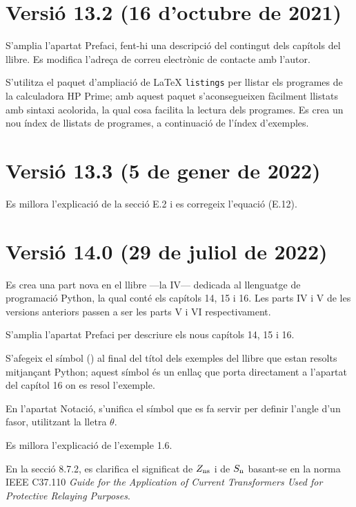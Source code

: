\section*{Versió 13.2 (16 d'octubre de 2021)}

S'amplia l'apartat Prefaci, fent-hi una descripció del contingut dels capítols del llibre. Es modifica l'adreça de correu electrònic de contacte amb l'autor.

S'utilitza el paquet d'ampliació de \LaTeX{} \texttt{listings} per llistar els programes de la calculadora \textsf{HP Prime}; amb aquest paquet s'aconsegueixen fàcilment  llistats amb sintaxi acolorida, la qual cosa facilita la lectura dels programes. Es crea un nou índex de llistats de programes, a continuació de l'índex d'exemples.


\section*{Versió 13.3 (5 de gener de 2022)}

Es millora l'explicació de la secció E.2 i es corregeix l'equació (E.12).


\section*{Versió 14.0 (29 de juliol de 2022)}

Es crea una part nova en el llibre ---la IV--- dedicada al llenguatge de programació Python, la qual conté els capítols 14, 15 i 16. Les parts IV i V de les versions anteriors passen a ser les parts V  i VI  respectivament. 

S'amplia l'apartat Prefaci per descriure els nous capítols 14, 15 i 16.

S'afegeix el símbol (\faPython) al final del títol dels  exemples del llibre que estan resolts mitjançant Python; aquest símbol és un enllaç que porta directament a l'apartat del capítol 16 on es resol l'exemple.

En l'apartat Notació, s'unifica el símbol que es fa servir per definir l'angle d'un fasor, utilitzant la lletra $\theta$.

Es millora l'explicació de l'exemple 1.6.

En la secció 8.7.2, es clarifica el significat de $Z_\mathrm{ns}$ i de $S_\mathrm{n}$ basant-se en la norma IEEE C37.110 \textit{ Guide for the Application of Current Transformers Used for Protective Relaying Purposes}.

